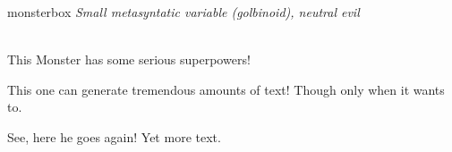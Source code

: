 \documentclass[10pt,twoside,twocolumn]{article}
\begin{document}
\begin{rpgmonsterbox}{monsterbox}
	\textit{Small metasyntatic variable (golbinoid), neutral evil}\\
	\hline
	\basics[%
	armorclass = 12,
	hitpoints  = 16 (3d8 + 3),
	speed      = 50 ft
	]
	\hline
	\stats[
    STR = \stat{12}, %
    DEX = \stat{7}
	]
	\hline
	\details[%
	languages = {Common Lisp, Erlang},
	]
	\hline \\[1mm]
	\begin{rpgmonsteraction}
		This Monster has some serious superpowers!
	\end{rpgmonsteraction}
	\begin{rpgmonsteraction}
		This one can generate tremendous amounts of text! Though only when it wants to.
	\end{rpgmonsteraction}

	\begin{rpgmonsteraction}
    See, here he goes again! Yet more text.
	\end{rpgmonsteraction}
\end{rpgmonsterbox}

\end{document}
